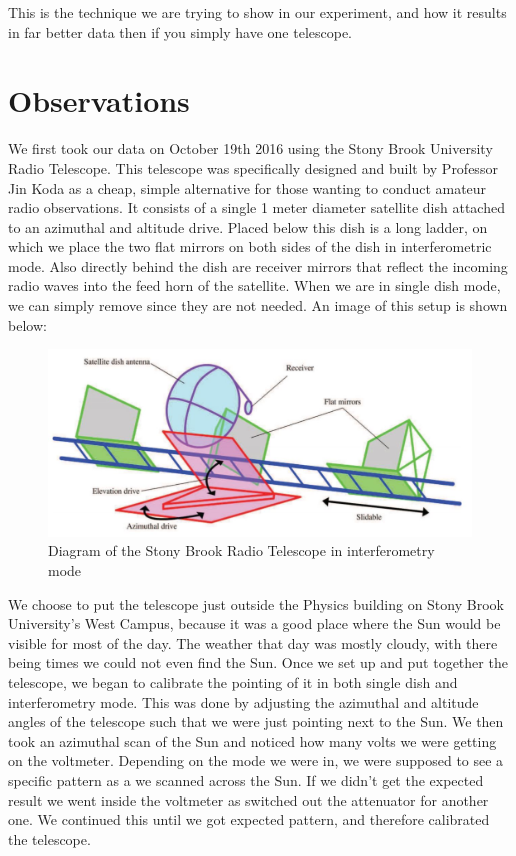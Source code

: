 \documentclass{aastex61}
\begin{document}
This is the technique we are trying to show in our experiment, and how it results in far better data then if you simply have one telescope. 

\section{Observations}
We first took our data on October 19th 2016 using the Stony Brook University Radio Telescope. This telescope was specifically designed and built by Professor Jin Koda as a cheap, simple alternative for those wanting to conduct amateur radio observations. It consists of a single 1 meter diameter satellite dish attached to an azimuthal and altitude drive. Placed below this dish is a long ladder, on which we place the two flat mirrors on both sides of the dish in interferometric mode. Also directly behind the dish are receiver mirrors that reflect the incoming radio waves into the feed horn of the satellite. When we are in single dish mode, we can simply remove since they are not needed. An image of this setup is shown below:
\begin{figure}[hbt!]
	\centering
	\includegraphics[scale = .45]{tourels.jpg}
	\caption{Diagram of the Stony Brook Radio Telescope in interferometry mode}
	\label{fig: refcurve1}
\end{figure}

We choose to put the telescope just outside the Physics building on Stony Brook University's West Campus, because it was a good place where the Sun would be visible for most of the day. The weather that day was mostly cloudy, with there being times we could not even find the Sun. Once we set up and put together the telescope, we began to calibrate the pointing of it in both single dish and interferometry mode. This was done by adjusting the azimuthal and altitude angles of the telescope such that we were just pointing next to the Sun. We then took an azimuthal scan of the Sun and noticed how many volts we were getting on the voltmeter. Depending on the mode we were in, we were supposed to see a specific pattern as a we scanned across the Sun. If we didn't get the expected result we went inside the voltmeter as switched out the attenuator for another one. We continued this until we got expected pattern, and therefore calibrated the telescope. 
\end{document}
